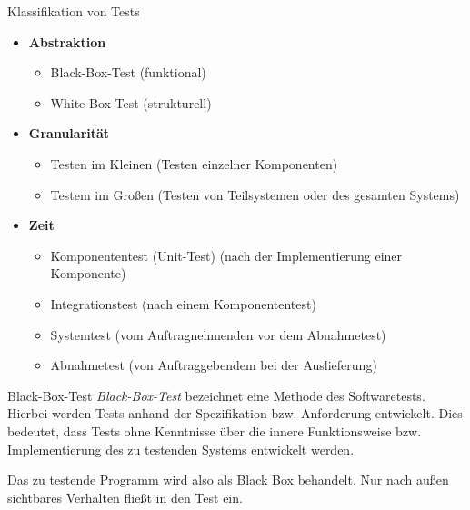 \begin{defi}{Klassifikation von Tests}
    \begin{itemize}
        \item \textbf{Abstraktion}
              \begin{itemize}
                  \item Black-Box-Test (funktional)
                  \item White-Box-Test (strukturell)
              \end{itemize}
        \item \textbf{Granularität}
              \begin{itemize}
                  \item Testen im Kleinen (Testen einzelner Komponenten)
                  \item Testem im Großen (Testen von Teilsystemen oder des gesamten Systems)
              \end{itemize}
        \item \textbf{Zeit}
              \begin{itemize}
                  \item Komponententest (Unit-Test) (nach der Implementierung einer Komponente)
                  \item Integrationstest (nach einem Komponententest)
                  \item Systemtest (vom Auftragnehmenden vor dem Abnahmetest)
                  \item Abnahmetest (von Auftraggebendem bei der Auslieferung)
              \end{itemize}
    \end{itemize}
\end{defi}

\begin{defi}{Black-Box-Test}
    \emph{Black-Box-Test} bezeichnet eine Methode des Softwaretests.
    Hierbei werden Tests anhand der Spezifikation bzw. Anforderung entwickelt.
    Dies bedeutet, dass Tests ohne Kenntnisse über die innere Funktionsweise bzw. Implementierung des zu testenden Systems entwickelt werden.

    Das zu testende Programm wird also als Black Box behandelt.
    Nur nach außen sichtbares Verhalten fließt in den Test ein.
\end{defi}

